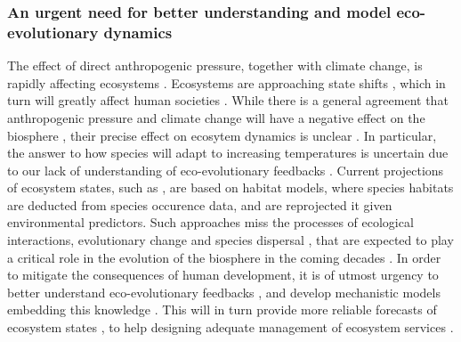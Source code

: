 \subsubsection*{An urgent need for better understanding and model eco-evolutionary dynamics}
The effect of direct anthropogenic pressure, together with climate change, is rapidly affecting ecosystems \cite{Ellis2011,Midgley2019}. Ecosystems are approaching state shifts \cite{Barnosky2011,Barnosky2012,Midgley2019}, which in turn will greatly affect human societies \cite{Mooney2009}.
%
% 
While there is a general agreement that anthropogenic pressure and climate change will have a negative effect on the biosphere \cite{fischlin2007ecosystems}, their precise effect on ecosytem dynamics is unclear \cite{Norberg2012}. In particular, the answer to how species will adapt to increasing temperatures is uncertain due to our lack of understanding of eco-evolutionary feedbacks \cite{Norberg2012}. 
% 
%
Current projections of ecosystem states, such as \cite{Midgley2019},
are based on habitat models, where species habitats are deducted from species occurence data, and are reprojected it given environmental predictors.
% 
Such approaches miss the processes of ecological interactions, evolutionary change and species dispersal \cite{Pearson2003}, that are expected to play a critical role in the evolution of the biosphere in the coming decades \cite{Norberg2012}.
% 
In order to mitigate the consequences of human development, it is of utmost urgency to better understand eco-evolutionary feedbacks \cite{Norberg2012}, and develop mechanistic models embedding this knowledge \cite{Urban2016}. This will in turn provide more reliable forecasts of ecosystem states \cite{Clark2001}, to help designing adequate management of ecosystem services \cite{Urban2016}.


